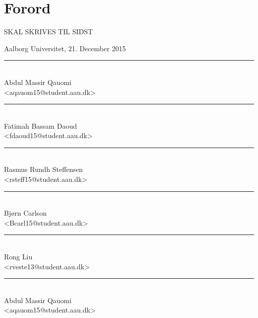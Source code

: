\chapter{Forord}
\label{chap:Forord}

SKAL SKRIVES TIL SIDST

\vspace{\baselineskip}\hfill Aalborg Universitet, 21. December 2015
\vfill

\noindent
\begin{minipage}[b]{0.45\textwidth}
 \centering
 \rule{\textwidth}{0.5pt}\\
  Abdul Massir Qauomi\\
 {\footnotesize <aqauom15@student.aau.dk>}
\end{minipage}
%
\hfill
%
\begin{minipage}[b]{0.45\textwidth}
 \centering
 \rule{\textwidth}{0.5pt}\\
  Fatimah Bassam Daoud\\
 {\footnotesize <fdaoud15@student.aau.dk>}
\end{minipage}
%
\vspace{3\baselineskip}

\noindent
\begin{minipage}[b]{0.45\textwidth}
 \centering
 \rule{\textwidth}{0.5pt}\\
  Rasmus Rundh Steffensen\\
 {\footnotesize <rsteff15@student.aau.dk>}
\end{minipage}
%
\hfill
%
\begin{minipage}[b]{0.45\textwidth}
 \centering
 \rule{\textwidth}{0.5pt}\\
  Bjørn Carlson\\
 {\footnotesize <Bcarl15@student.aau.dk>}
\end{minipage}
\vspace{3\baselineskip}

\noindent
\begin{minipage}[b]{0.45\textwidth}
 \centering
 \rule{\textwidth}{0.5pt}\\
  Rong Liu\\
 {\footnotesize <rveste13@student.aau.dk>}
\end{minipage}
%
\hfill
%
\begin{minipage}[b]{0.45\textwidth}
 \centering
 \rule{\textwidth}{0.5pt}\\
  Abdul Massir Qauomi\\
 {\footnotesize <aqauom15@student.aau.dk>}
\end{minipage}
\vspace{3\baselineskip}
